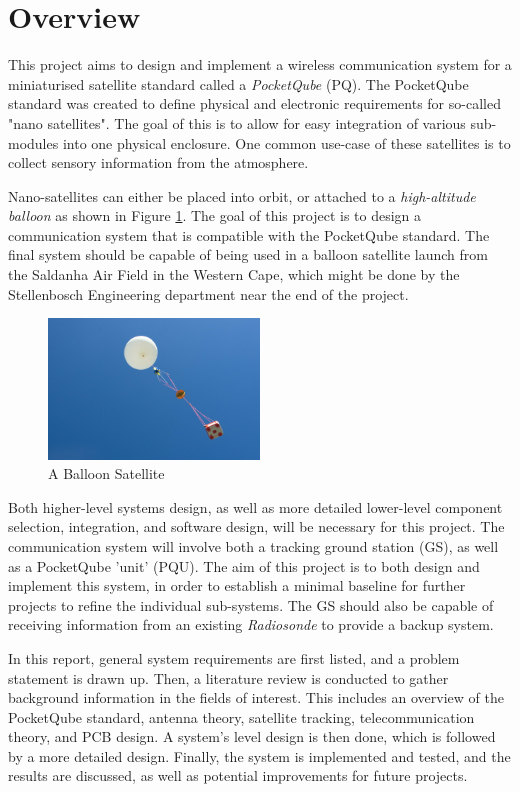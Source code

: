 \graphicspath{{./figures}}

\section{Overview}

This project aims to design and implement a wireless communication system for a miniaturised satellite standard called a \textit{PocketQube} (PQ). The PocketQube standard was created to define physical and electronic requirements for so-called "nano satellites". The goal of this is to allow for easy integration of various sub-modules into one physical enclosure. One common use-case of these satellites is to collect sensory information from the atmosphere.

Nano-satellites can either be placed into orbit, or attached to a \textit{high-altitude balloon} as shown in Figure \ref{fig:balloonSat}. The goal of this project is to design a communication system that is compatible with the PocketQube standard. The final system should be capable of being used in a balloon satellite launch from the Saldanha Air Field in the Western Cape, which might be done by the Stellenbosch Engineering department near the end of the project.

\begin{figure}[!htb]
  \centering
  \includegraphics[width=0.5\textwidth]{balloonSat}
  \caption{A Balloon Satellite}
  \label{fig:balloonSat}
\end{figure}

Both higher-level systems design, as well as more detailed lower-level component selection, integration, and software design, will be necessary for this project. The communication system will involve both a tracking ground station (GS), as well as a PocketQube 'unit' (PQU). The aim of this project is to both design and implement this system, in order to establish a minimal baseline for further projects to refine the individual sub-systems. The GS should also be capable of receiving information from an existing \textit{Radiosonde} to provide a backup system.

In this report, general system requirements are first listed, and a problem statement is drawn up. Then, a literature review is conducted to gather background information in the fields of interest. This includes an overview of the PocketQube standard, antenna theory, satellite tracking, telecommunication theory, and PCB design. A system's level design is then done, which is followed by a more detailed design. Finally, the system is implemented and tested, and the results are discussed, as well as potential improvements for future projects.